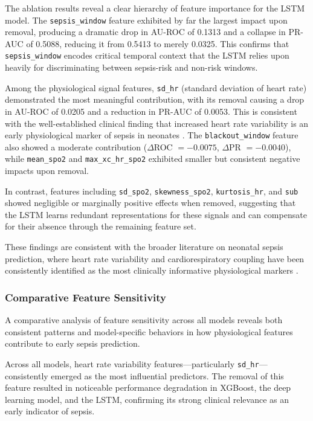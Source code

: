 \documentclass[conference]{IEEEtran}
\begin{document}
The ablation results reveal a clear hierarchy of feature importance 
for the LSTM model. The \texttt{sepsis\_window} feature exhibited by 
far the largest impact upon removal, producing a dramatic drop in 
AU-ROC of 0.1313 and a collapse in PR-AUC of 0.5088, reducing it 
from 0.5413 to merely 0.0325. This confirms that \texttt{sepsis\_window} 
encodes critical temporal context that the LSTM relies upon heavily 
for discriminating between sepsis-risk and non-risk windows.

Among the physiological signal features, \texttt{sd\_hr} (standard 
deviation of heart rate) demonstrated the most meaningful contribution, 
with its removal causing a drop in AU-ROC of 0.0205 and a reduction 
in PR-AUC of 0.0053. This is consistent with the well-established 
clinical finding that increased heart rate variability is an early 
physiological marker of sepsis in neonates 
\cite{hero_monitoring,vital_sign_ml}. The \texttt{blackout\_window} 
feature also showed a moderate contribution ($\Delta$ROC $= -0.0075$, 
$\Delta$PR $= -0.0040$), while \texttt{mean\_spo2} and 
\texttt{max\_xc\_hr\_spo2} exhibited smaller but consistent 
negative impacts upon removal.

In contrast, features including \texttt{sd\_spo2}, 
\texttt{skewness\_spo2}, \texttt{kurtosis\_hr}, and \texttt{sub} 
showed negligible or marginally positive effects when removed, 
suggesting that the LSTM learns redundant representations for 
these signals and can compensate for their absence through 
the remaining feature set.

These findings are consistent with the broader literature on 
neonatal sepsis prediction, where heart rate variability and 
cardiorespiratory coupling have been consistently identified 
as the most clinically informative physiological markers 
\cite{hero_monitoring,Shashikumar2017EarlySepsis}.


\subsubsection{Comparative Feature Sensitivity}

A comparative analysis of feature sensitivity across all models reveals both consistent patterns and model-specific behaviors in how physiological features contribute to early sepsis prediction.

Across all models, heart rate variability features—particularly \texttt{sd\_hr}—consistently emerged as the most influential predictors. The removal of this feature resulted in noticeable performance degradation in XGBoost, the deep learning model, and the LSTM, confirming its strong clinical relevance as an early indicator of sepsis.
\end{document}
